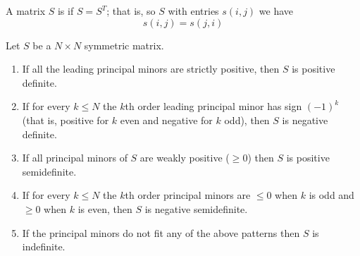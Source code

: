 \documentclass{article}
\begin{document}
\begin{definition}
  A matrix $S$ is  if $S = S^T$; that is, so $S$ with entries $s(i, j)$ we have
  \[
    s(i, j) = s(j, i)
  \]
\end{definition}

\begin{theorem}
  Let $S$ be a $N \times N$ symmetric matrix.
  \begin{enumerate}
    \item If all the leading principal minors are strictly positive, then $S$ is positive definite.

    \item If for every $k \le N$ the $k$th order leading principal minor has sign $(-1)^k$ (that is, positive for $k$ even and negative for $k$ odd), then $S$ is negative definite.

    \item If all principal minors of $S$ are weakly positive ($\ge 0$) then $S$ is positive semidefinite.

    \item If for every $k \le N$ the $k$th order principal minors are $\le 0$ when $k$ is odd and $\ge 0$ when $k$ is even, then $S$ is negative semidefinite.

    \item If the principal minors do not fit any of the above patterns then $S$ is indefinite.
  \end{enumerate}
\end{theorem}
\end{document}

